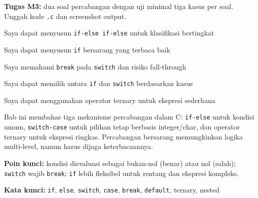 \documentclass[../main.tex]{subfiles}
\begin{document}
\begin{asesmen}
\textbf{Tugas M3:} dua soal percabangan dengan uji minimal tiga kasus per soal. Unggah kode \texttt{.c} dan screenshot output.
\end{asesmen}

\begin{checklist}
  \item Saya dapat menyusun \texttt{if-else if-else} untuk klasifikasi bertingkat
  \item Saya dapat menyusun \texttt{if} bersarang yang terbaca baik
  \item Saya memahami \texttt{break} pada \texttt{switch} dan risiko fall-through
  \item Saya dapat memilih antara \texttt{if} dan \texttt{switch} berdasarkan kasus
  \item Saya dapat menggunakan operator ternary untuk ekspresi sederhana
\end{checklist}

\begin{rangkuman}
Bab ini membahas tiga mekanisme percabangan dalam C: \texttt{if-else} untuk kondisi umum, \texttt{switch-case} untuk pilihan tetap berbasis integer/char, dan operator ternary untuk ekspresi ringkas. Percabangan bersarang memungkinkan logika multi-level, namun harus dijaga keterbacaannya.

\textbf{Poin kunci:} kondisi dievaluasi sebagai bukan-nol (benar) atau nol (salah); \texttt{switch} wajib \texttt{break}; \texttt{if} lebih fleksibel untuk rentang dan ekspresi kompleks.

\textbf{Kata kunci:} \texttt{if}, \texttt{else}, \texttt{switch}, \texttt{case}, \texttt{break}, \texttt{default}, ternary, nested
\end{rangkuman}
\end{document}
